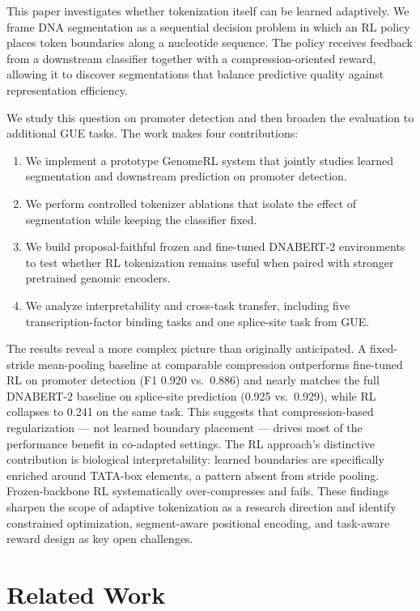 \documentclass[sigconf,screen]{acmart}
\newcommand{\method}{GenomeRL\xspace}
\newcommand{\dnabert}{DNABERT-2\xspace}
\begin{document}
This paper investigates whether tokenization itself can be learned adaptively. We frame DNA segmentation as a sequential decision problem in which an RL policy places token boundaries along a nucleotide sequence. The policy receives feedback from a downstream classifier together with a compression-oriented reward, allowing it to discover segmentations that balance predictive quality against representation efficiency.

We study this question on promoter detection and then broaden the evaluation to additional GUE tasks. The work makes four contributions:
\begin{enumerate}[leftmargin=*,nosep]
\item We implement a prototype \method system that jointly studies learned segmentation and downstream prediction on promoter detection.
\item We perform controlled tokenizer ablations that isolate the effect of segmentation while keeping the classifier fixed.
\item We build proposal-faithful frozen and fine-tuned \dnabert environments to test whether RL tokenization remains useful when paired with stronger pretrained genomic encoders.
\item We analyze interpretability and cross-task transfer, including five transcription-factor binding tasks and one splice-site task from GUE.
\end{enumerate}

The results reveal a more complex picture than originally anticipated. A fixed-stride mean-pooling baseline at comparable compression outperforms fine-tuned RL on promoter detection (F1 0.920 vs.\ 0.886) and nearly matches the full \dnabert baseline on splice-site prediction (0.925 vs.\ 0.929), while RL collapses to 0.241 on the same task. This suggests that compression-based regularization — not learned boundary placement — drives most of the performance benefit in co-adapted settings. The RL approach's distinctive contribution is biological interpretability: learned boundaries are specifically enriched around TATA-box elements, a pattern absent from stride pooling. Frozen-backbone RL systematically over-compresses and fails. These findings sharpen the scope of adaptive tokenization as a research direction and identify constrained optimization, segment-aware positional encoding, and task-aware reward design as key open challenges.

\section{Related Work}
\end{document}
